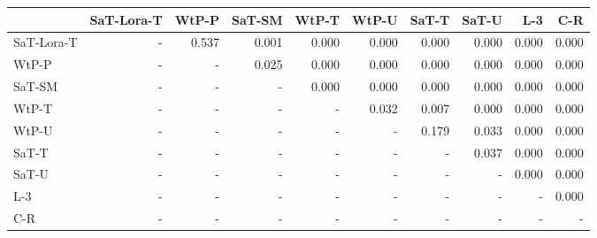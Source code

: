 \begin{tabular}{lrrrrrrrrr}
\toprule
 & SaT-Lora-T & WtP-P & SaT-SM & WtP-T & WtP-U & SaT-T & SaT-U & L-3 & C-R \\
\midrule
SaT-Lora-T & - & 0.537 & 0.001 & 0.000 & 0.000 & 0.000 & 0.000 & 0.000 & 0.000 \\
WtP-P & - & - & 0.025 & 0.000 & 0.000 & 0.000 & 0.000 & 0.000 & 0.000 \\
SaT-SM & - & - & - & 0.000 & 0.000 & 0.000 & 0.000 & 0.000 & 0.000 \\
WtP-T & - & - & - & - & 0.032 & 0.007 & 0.000 & 0.000 & 0.000 \\
WtP-U & - & - & - & - & - & 0.179 & 0.033 & 0.000 & 0.000 \\
SaT-T & - & - & - & - & - & - & 0.037 & 0.000 & 0.000 \\
SaT-U & - & - & - & - & - & - & - & 0.000 & 0.000 \\
L-3 & - & - & - & - & - & - & - & - & 0.000 \\
C-R & - & - & - & - & - & - & - & - & - \\
\bottomrule
\end{tabular}


